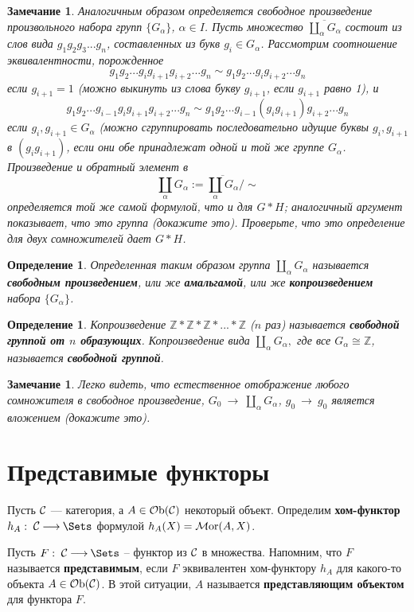 \documentclass[12pt]{book}
\newcommand{\arrow}{{\:\longrightarrow\:}}
\newcommand{\Ob}{\operatorname{{\cal O}b}}
\newcommand{\Mor}{\operatorname{{\cal M}or}}
\newcommand{\cac}{{\cal C}}
\def\Z{{\mathbb Z}}
\theoremstyle{upshape}
\newtheorem{zadacha}{Задача}[chapter]
\theoremstyle{generic}
\newtheorem{opredelenie}[teorema]{Определение}
\newtheorem{remark}[teorema]{Замечание}
\def\замечание{\begin{remark}}
\def\еза{\end{remark}}
\theoremstyle{upshapenonumber}
\newcommand{\следствие}{%
     \refstepcounter{teorema}
     {\noindent\bf Следствие \thechapter.\arabic{teorema}:\ }}
\newcommand{\пример}{%
     \refstepcounter{teorema}
     {\noindent\bf Пример \thechapter.\arabic{teorema}:\ }}
\newcommand{\лемма}{%
     \refstepcounter{teorema}
     {\noindent\bf Лемма \thechapter.\arabic{teorema}:\ }}
\newcommand{\теорема}{%
     \refstepcounter{teorema}
     {\noindent\bf Теорема \thechapter.\arabic{teorema}:\ }}
\newcommand{\утверждение}{%
     \refstepcounter{teorema}
     {\noindent\bf Утверждение \thechapter.\arabic{teorema}:\ }}
\def\бф{\bf}
\def\ем{\em}
\def\задача{\begin{zadacha}}
\def\ез{\end{zadacha}}
\def\еу{\end{ukazanie}}
\def\определение{\begin{opredelenie}}
\def\ео{\end{opredelenie}}
\def\енум{\begin{enumerate}}
\def\ее{\end{enumerate}}
\begin{document}
\замечание
Аналогичным образом определяется свободное произведение
произвольного набора групп $\{G_\alpha\}$, $\alpha\in I$.
Пусть множество $\overline{\coprod_\alpha G_\alpha}$ состоит из
 слов вида $g_1g_2g_3...g_n$, составленных из букв 
$g_i\in G_\alpha$.
Рассмотрим соотношение эквивалентности, порожденное
\[
g_1g_2...g_ig_{i+1}g_{i+2}...g_n\sim g_1g_2...g_ig_{i+2}...g_n
\]
если $g_{i+1}=1$ (можно выкинуть из слова букву $g_{i+1}$, если
$g_{i+1}$ равно 1), и 
\[
g_1g_2...g_{i-1}g_ig_{i+1}g_{i+2}...g_n\sim 
g_1g_2...g_{i-1}(g_ig_{i+1})g_{i+2}...g_n
\]
если $g_i, g_{i+1}\in G_\alpha$
(можно сгруппировать последовательно идущие 
буквы $g_i, g_{i+1}$ в $(g_ig_{i+1})$, если
они обе принадлежат одной и той же группе
$G_\alpha$. Произведение и обратный элемент
в 
\[ 
\coprod_\alpha G_\alpha := \overline{\coprod_\alpha
G_\alpha}/\sim
\]
определяется той же самой формулой, что и для 
 $G*H$; аналогичный аргумент показывает,
что это группа (докажите это). Проверьте,
что это определение для двух сомножителей
дает $G*H$. 
\еза

\определение
Определенная таким образом группа $\coprod_\alpha G_\alpha$ 
называется  {\бф свободным произведением},
или же {\бф амальгамой}, или же {\бф копроизведением}
набора $\{G_\alpha\}$.
\ео

\определение
Копроизведение
$\Z * \Z * \Z * ... *\Z$ ($n$ раз) называется 
{\бф свободной группой от $n$ образующих}. 
Копроизведение вида
$\coprod_\alpha G_\alpha,$ где все $G_\alpha\cong \Z$,
называется {\бф свободной группой}.
\ео




\замечание
Легко видеть, что естественное отображение любого 
сомножителя в свободное произведение,
$G_0 \arrow \coprod_\alpha G_\alpha$, 
$g_0 \arrow g_0$ является вложением (докажите это).
\еза




\section{Представимые функторы}

Пусть $\cac$ --- категория, а $A\in \Ob(\cac)$
некоторый объект. Определим {\бф хом-функтор} 
$h_A:\; \cac \arrow \Sets$ формулой
$h_A(X) = \Mor(A,X)$.

Пусть $F:\; \cac \arrow \Sets$ --
функтор из $\cac$ в множества. Напомним, что $F$
называется {\бф представимым}, если $F$ эквивалентен
хом-функтору $h_A$ для какого-то объекта
$A\in \Ob(\cac)$. В этой ситуации, $A$ называется
{\бф представляющим объектом} для функтора $F$.
\end{document}
